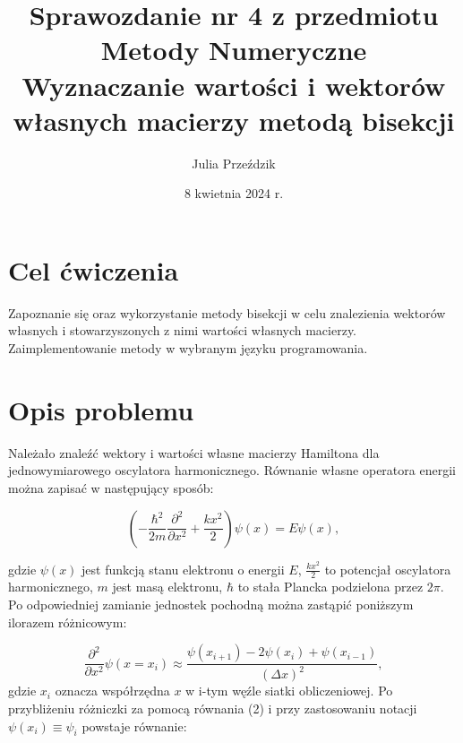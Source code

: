 \documentclass{article}
\begin{document}
\Large




\title{\LARGE Sprawozdanie nr 4 z przedmiotu Metody Numeryczne\\
       \LARGE Wyznaczanie wartości i wektorów własnych macierzy metodą bisekcji}
\author{Julia Przeździk}
\date{8 kwietnia 2024 r.}
\maketitle

\large



\section{Cel ćwiczenia}
Zapoznanie się oraz wykorzystanie metody bisekcji w celu znalezienia wektorów własnych i stowarzyszonych z nimi wartości własnych macierzy. Zaimplementowanie metody w wybranym języku programowania.

\section{Opis problemu}
Należało znaleźć wektory i wartości własne macierzy Hamiltona dla jednowymiarowego oscylatora harmonicznego. Równanie własne operatora energii można zapisać w następujący sposób:

\begin{equation}
\left( -\frac{\hbar^2}{2m} \frac{\partial^2}{\partial x^2} + \frac{kx^2}{2} \right) \psi(x) = E\psi(x),
\end{equation}

\noindent
gdzie \(\psi(x)\) jest funkcją stanu elektronu o energii \(E\), \(\frac{kx^2}{2}\) to potencjał oscylatora harmonicznego, \(m\) jest masą elektronu, \(\hbar\) to stała Plancka podzielona przez \(2\pi\). Po odpowiedniej zamianie jednostek pochodną można zastąpić poniższym ilorazem różnicowym: 

\begin{equation}
\frac{\partial^2}{\partial x^2} \psi(x = x_i) \approx \frac{\psi(x_{i+1}) - 2\psi(x_i) + \psi(x_{i-1})}{(\Delta x)^2},
\end{equation}
\noindent
gdzie $x_i$ oznacza współrzędna $x$ w i-tym węźle siatki obliczeniowej. Po przybliżeniu różniczki za pomocą równania (2) i przy zastosowaniu notacji $\psi(x_i) \equiv \psi_i$ powstaje równanie: 
\end{document}

